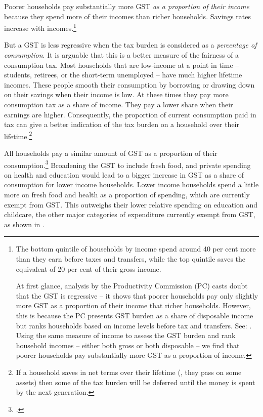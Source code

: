 \documentclass{grattanAlpha}
\begin{document}
Poorer households pay substantially more GST \emph{as a proportion of their income} because they spend more of their incomes than richer households. Savings rates increase with incomes.\footnote{The bottom quintile of households by income spend around 40 per cent more than they earn before taxes and transfers, while the top quintile saves the equivalent of 20 per cent of their gross income. 

At first glance, analysis by the Productivity Commission (PC) casts doubt that the GST is regressive  – it shows that poorer households pay only slightly more GST as a proportion of their income that richer households. However, this is because the PC presents GST burden as a share of disposable income but ranks households based on income levels before tax and transfers. See: \textcite[][74--76]{ProductivityCommission2015-Tax-and-transfer-incidence}.  Using the same measure of income to assess the GST burden and rank household incomes – either both gross or both disposable – we find that poorer households pay substantially more GST as a proportion of income.
} 

But a GST is less regressive when the tax burden is considered as a \emph{percentage of consumption}. It is arguable that this is a better measure of the fairness of a consumption tax. Most households that are low-income at a point in time – students, retirees, or the short-term unemployed – have much higher lifetime incomes. These people smooth their consumption by borrowing or drawing down on their savings when their income is low. At these times they pay more consumption tax as a share of income. They pay a lower share when their earnings are higher. Consequently, the proportion of current consumption paid in tax can give a better indication of the tax burden on a household over their lifetime.\footnote{\textcites[][275]{HenryTaxReview2010}[][34--36]{OECDKoreaInstitutePublicFinance2014-Distributional-Effects-Consumption-Taxes} If a household saves in net terms over their lifetime (\ie, they pass on some assets) then some of the tax burden will be deferred until the money is spent by the next generation.}

All households pay a similar amount of GST as a proportion of their consumption.\footcite[][41]{OECDKoreaInstitutePublicFinance2014-Distributional-Effects-Consumption-Taxes} Broadening the GST to include fresh food, and private spending on health and education would lead to a bigger increase in GST as a share of consumption for lower income households. Lower income households spend a little more on fresh food and health as a proportion of spending, which are currently exempt from GST. This outweighs their lower relative spending on education and childcare, the other major categories of expenditure currently exempt from GST, as shown in .
\end{document}
